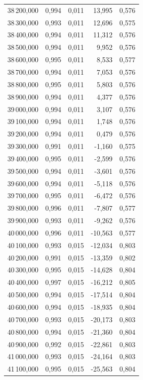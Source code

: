 \begin{longtable}{rrrrr}
38\,200,000 & 0,994 & 0,011 & 13,995 & 0,576\\
38\,300,000 & 0,993 & 0,011 & 12,696 & 0,575\\
38\,400,000 & 0,994 & 0,011 & 11,312 & 0,576\\
38\,500,000 & 0,994 & 0,011 & 9,952 & 0,576\\
38\,600,000 & 0,995 & 0,011 & 8,533 & 0,577\\
38\,700,000 & 0,994 & 0,011 & 7,053 & 0,576\\
38\,800,000 & 0,995 & 0,011 & 5,803 & 0,576\\
38\,900,000 & 0,994 & 0,011 & 4,377 & 0,576\\
39\,000,000 & 0,994 & 0,011 & 3,107 & 0,576\\
39\,100,000 & 0,994 & 0,011 & 1,748 & 0,576\\
39\,200,000 & 0,994 & 0,011 & 0,479 & 0,576\\
39\,300,000 & 0,991 & 0,011 & -1,160 & 0,575\\
39\,400,000 & 0,995 & 0,011 & -2,599 & 0,576\\
39\,500,000 & 0,994 & 0,011 & -3,601 & 0,576\\
39\,600,000 & 0,994 & 0,011 & -5,118 & 0,576\\
39\,700,000 & 0,995 & 0,011 & -6,472 & 0,576\\
39\,800,000 & 0,996 & 0,011 & -7,807 & 0,577\\
39\,900,000 & 0,993 & 0,011 & -9,262 & 0,576\\
40\,000,000 & 0,996 & 0,011 & -10,563 & 0,577\\
40\,100,000 & 0,993 & 0,015 & -12,034 & 0,803\\
40\,200,000 & 0,991 & 0,015 & -13,359 & 0,802\\
40\,300,000 & 0,995 & 0,015 & -14,628 & 0,804\\
40\,400,000 & 0,997 & 0,015 & -16,212 & 0,805\\
40\,500,000 & 0,994 & 0,015 & -17,514 & 0,804\\
40\,600,000 & 0,994 & 0,015 & -18,935 & 0,804\\
40\,700,000 & 0,993 & 0,015 & -20,173 & 0,803\\
40\,800,000 & 0,994 & 0,015 & -21,360 & 0,804\\
40\,900,000 & 0,992 & 0,015 & -22,861 & 0,803\\
41\,000,000 & 0,993 & 0,015 & -24,164 & 0,803\\
41\,100,000 & 0,995 & 0,015 & -25,563 & 0,804\\

\end{longtable}
